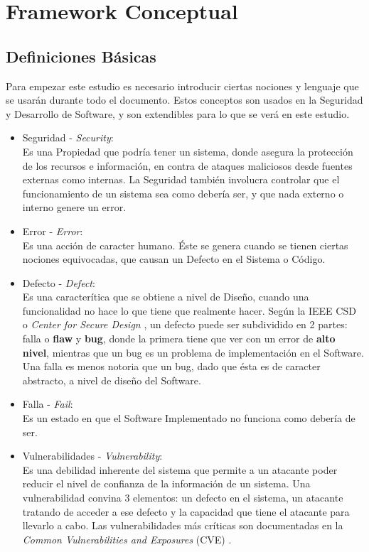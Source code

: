 \chapter{Framework Conceptual}
\label{chap2:FC}


\section{Definiciones Básicas}
\label{chap2:Def}

Para empezar este estudio es necesario introducir ciertas nociones y lenguaje que se usarán durante todo el documento. Estos conceptos son usados en la Seguridad y Desarrollo de Software, y son extendibles para lo que se verá en este estudio.

\begin{itemize}
    \item Seguridad - \textit{Security}:
        \\Es una Propiedad que podría tener un sistema, donde asegura la protección de los recursos e información, en contra de ataques maliciosos desde fuentes externas como internas. La Seguridad también involucra controlar que el funcionamiento de un sistema sea como debería ser, y que nada externo o interno genere un error.
    \item Error - \textit{Error}:
        \\Es una acción de caracter humano. Éste se genera cuando se tienen ciertas nociones equivocadas, que causan un Defecto en el Sistema o Código.
    \item Defecto  - \textit{Defect}:
        \\Es una caracterítica que se obtiene a nivel de Diseño, cuando una funcionalidad no hace lo que tiene que realmente hacer. Según la IEEE CSD o \textit{Center for Secure Design} \cite{ieeecsd2}, un defecto puede ser subdividido en 2 partes: falla o \textbf{flaw} y \textbf{bug}, donde la primera tiene que ver con un error de \textbf{alto nivel}, mientras que un bug es un problema de implementación en el Software. Una falla es menos notoria que un bug, dado que ésta es de caracter abstracto, a nivel de diseño del Software.
    \item Falla - \textit{Fail}:
        \\Es un estado en que el Software Implementado no funciona como debería de ser.
    \item Vulnerabilidades - \textit{Vulnerability}:
        \\Es una debilidad inherente del sistema que permite a un atacante poder reducir el nivel de confianza de la información de un sistema. Una vulnerabilidad convina 3 elementos: un defecto en el sistema, un atacante tratando de acceder a ese defecto y la capacidad que tiene el atacante para llevarlo a cabo. Las vulnerabilidades más críticas son documentadas en la \textit{Common Vulnerabilities and Exposures} (CVE) \cite{cve}.

\end{itemize}
